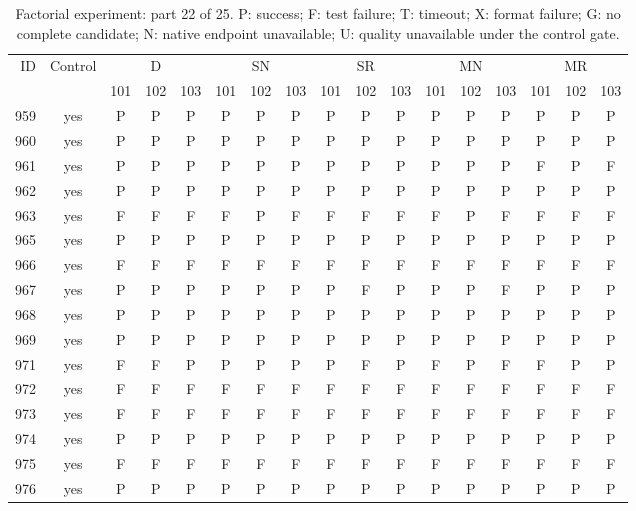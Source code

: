 \begin{table}[p]\centering\footnotesize
\setlength{\tabcolsep}{3pt}
\caption{Factorial experiment: part 22 of 25. P: success; F: test failure; T: timeout; X: format failure; G: no complete candidate; N: native endpoint unavailable; U: quality unavailable under the control gate.}
\begin{tabular*}{\textwidth}{@{\extracolsep{\fill}}rcccccccccccccccc}\toprule
ID & Control & \multicolumn{3}{c}{D} & \multicolumn{3}{c}{SN} & \multicolumn{3}{c}{SR} & \multicolumn{3}{c}{MN} & \multicolumn{3}{c}{MR}\\
\cmidrule(lr){3-5}\cmidrule(lr){6-8}\cmidrule(lr){9-11}\cmidrule(lr){12-14}\cmidrule(lr){15-17}
 & & 101 & 102 & 103 & 101 & 102 & 103 & 101 & 102 & 103 & 101 & 102 & 103 & 101 & 102 & 103\\\midrule
959 & yes & P & P & P & P & P & P & P & P & P & P & P & P & P & P & P\\
960 & yes & P & P & P & P & P & P & P & P & P & P & P & P & P & P & P\\
961 & yes & P & P & P & P & P & P & P & P & P & P & P & P & F & P & F\\
962 & yes & P & P & P & P & P & P & P & P & P & P & P & P & P & P & P\\
963 & yes & F & F & F & F & P & F & F & F & F & F & P & F & F & F & F\\
965 & yes & P & P & P & P & P & P & P & P & P & P & P & P & P & P & P\\
966 & yes & F & F & F & F & F & F & F & F & F & F & F & F & F & F & F\\
967 & yes & P & P & P & P & P & P & P & F & P & P & P & F & P & P & P\\
968 & yes & P & P & P & P & P & P & P & P & P & P & P & P & P & P & P\\
969 & yes & P & P & P & P & P & P & P & P & P & P & P & P & P & P & P\\
971 & yes & F & F & P & P & P & P & P & F & P & F & P & F & F & P & P\\
972 & yes & F & F & F & F & F & F & F & F & F & F & F & F & F & F & F\\
973 & yes & F & F & F & F & F & F & F & F & F & F & F & F & F & F & F\\
974 & yes & P & P & P & P & P & P & P & P & P & P & P & P & P & P & P\\
975 & yes & F & F & F & F & F & F & F & F & F & F & F & F & F & F & F\\
976 & yes & P & P & P & P & P & P & P & P & P & P & P & P & P & P & P\\

\end{tabular*}
\end{table}
